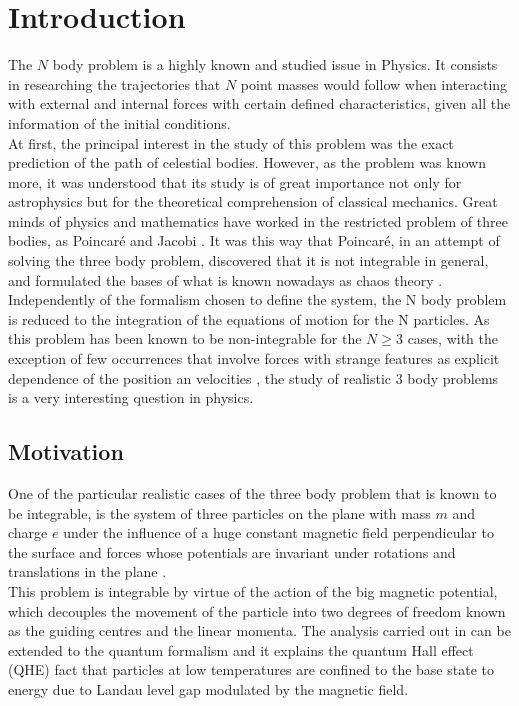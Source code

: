 \chapter{Introduction}
The $N$ body problem is a highly known and studied issue in Physics. It consists in researching the trajectories that $N$ point masses would follow when interacting with external and internal forces with certain defined characteristics, given all the information of the initial conditions.\\

At first, the principal interest in the study of this problem was the exact prediction of the path of celestial bodies. However, as the problem was known more, it was understood that its study is of great importance not only for astrophysics but for the theoretical comprehension of classical mechanics. Great minds of physics and mathematics have worked in the restricted problem of three bodies, as Poincar\'e \cite{introPoincare} and Jacobi \cite{introJacobi}. It was this way that Poincar\'e, in an attempt of solving the three body problem, discovered that it is not integrable in general, and formulated the bases of what is known nowadays as chaos theory \cite{introPoincare}.\\

Independently of the formalism chosen to define the system, the N body problem is reduced to the integration of the equations of motion for the N particles. As this problem has been known to be non-integrable for the $N\geq 3$ cases, with the exception of few occurrences that involve forces with strange features as explicit dependence of the position an velocities \cite{strangeCases}, the study of realistic 3 body problems is a very interesting question in physics.\\

\section{Motivation}
One of the particular realistic cases of the three body problem that is known to be integrable, is the system of three particles on the plane with mass $m$ and charge $e$ under the influence of a huge constant magnetic field perpendicular to the surface and forces whose potentials are invariant under rotations and translations in the plane \cite{alonso}.\\

This problem is integrable by virtue of the action of the big magnetic potential, which decouples the movement of  the particle into two degrees of freedom known as the guiding centres and the linear momenta. The analysis carried out in \cite{alonso} can be extended to the quantum formalism and it explains the quantum Hall effect (QHE) fact that particles at low temperatures are confined to the base state to energy due to Landau level gap modulated by the magnetic field.\\

